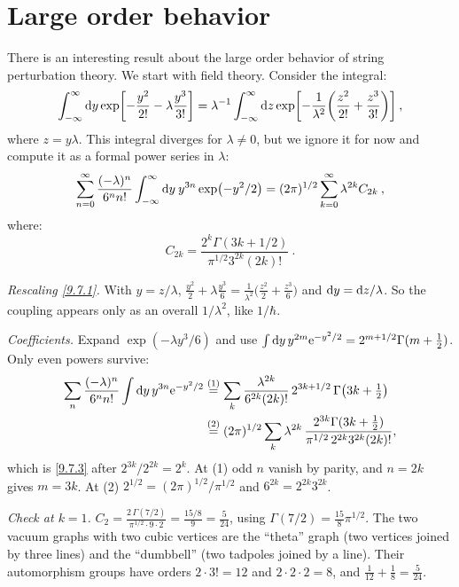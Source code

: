\section{Large order behavior} \label{sec:9.7}

There is an interesting result about the large order behavior of string perturbation theory. We start with field theory.
Consider the integral:
\begin{equation}
	\int_{-\infty}^{\infty} \mathrm{d} y \exp \biggl[-\frac{y^{2}}{2!} - \lambda \frac{y^{3}}{3!}\biggr] = 
	\lambda^{-1} \int_{-\infty}^{\infty} \mathrm{d} z \exp \biggl[-\frac{1}{\lambda^{2}}\biggl(\frac{z^{2}}{2!}+\frac{z^{3}}{3!}\biggr)\biggr] \:,
	\label{9.7.1}
\end{equation}
where $z=y \lambda $.
This integral diverges for $\lambda \neq 0$, but we ignore it for now and compute it as a formal power series in $\lambda$:
\begin{equation}
	\sum_{n=0}^{\infty} \frac{(-\lambda)^{n}}{6^{n} n !} \int_{-\infty}^{\infty} \mathrm{d} y\: y^{3 n} 
	\exp (-y^{2} / 2) = (2 \pi)^{1 / 2} \sum_{k=0}^{\infty} \lambda^{2 k} C_{2 k} \:, \label{9.7.2}
\end{equation}
where:
\begin{equation}
	C_{2 k}=\frac{2^{k} \Gamma(3 k+1 / 2)}{\pi^{1 / 2} 3^{2 k}(2 k) !} \:.
	\label{9.7.3}
\end{equation}
\begin{tcolorbox}[breakable]
	\begin{remark}
		\emph{Rescaling \eqref{9.7.1}.} With $y=z/\lambda$, $\frac{y^2}{2}+\lambda\frac{y^3}{6}=\frac{1}{\lambda^2}\bigl(\frac{z^2}{2}+\frac{z^3}{6}\bigr)$ and $\mathrm{d} y=\mathrm{d} z/\lambda$. So the coupling appears only as an overall $1/\lambda^2$, like $1/\hbar$.

		\emph{Coefficients.} Expand $\exp(-\lambda y^3/6)$ and use $\int\mathrm{d} y\,y^{2m}\mathrm{e}^{-y^2/2}=2^{m+1/2}\Gamma(m+\frac12)$. Only even powers survive:
		\begin{align*}
			\sum_{n}\frac{(-\lambda)^n}{6^nn!}\int\mathrm{d} y\,y^{3n}\mathrm{e}^{-y^2/2}
			&\overset{(1)}{=}\sum_k\frac{\lambda^{2k}}{6^{2k}(2k)!}\,2^{3k+1/2}\,\Gamma\bigl(3k+\tfrac12\bigr)\\
			&\overset{(2)}{=}(2\pi)^{1/2}\sum_k\lambda^{2k}\,\frac{2^{3k}\Gamma(3k+\frac12)}{\pi^{1/2}\,2^{2k}3^{2k}(2k)!} ,
		\end{align*}
		which is \eqref{9.7.3} after $2^{3k}/2^{2k}=2^k$. At (1) odd $n$ vanish by parity, and $n=2k$ gives $m=3k$. At (2) $2^{1/2}=(2\pi)^{1/2}/\pi^{1/2}$ and $6^{2k}=2^{2k}3^{2k}$.

		\emph{Check at $k=1$.} $C_2=\frac{2\,\Gamma(7/2)}{\pi^{1/2}\cdot9\cdot2}=\frac{15/8}{9}=\frac{5}{24}$, using $\Gamma(7/2)=\frac{15}{8}\pi^{1/2}$. The two vacuum graphs with two cubic vertices are the ``theta'' graph (two vertices joined by three lines) and the ``dumbbell'' (two tadpoles joined by a line). Their automorphism groups have orders $2\cdot3!=12$ and $2\cdot2\cdot2=8$, and $\frac1{12}+\frac18=\frac{5}{24}$.
	\end{remark}
\end{tcolorbox}

